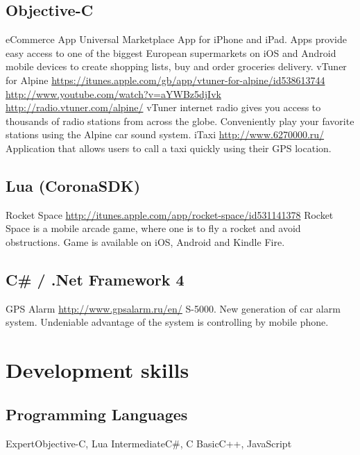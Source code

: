 \documentclass[11pt,a4paper]{moderncv}
\begin{document}
  \subsection{Objective-C}
  \cvitem
    {eCommerce App}
    {Universal Marketplace App for iPhone and iPad. Apps provide easy access to one of the biggest European supermarkets on iOS and Android mobile devices to create shopping lists, buy and order groceries delivery.}
  \cvitem
    {vTuner for Alpine}
    {\url{https://itunes.apple.com/gb/app/vtuner-for-alpine/id538613744}\newline{}
    \url{http://www.youtube.com/watch?v=aYWBz5djIvk}\newline
    \url{http://radio.vtuner.com/alpine/}\newline
    vTuner internet radio gives you access to thousands of radio stations from across the globe.
    \newline Conveniently play your favorite stations using the Alpine car sound system. }
  \cvitem
    {iTaxi}
    {\url{http://www.6270000.ru/}\newline{}
    Application that allows users to call a taxi quickly using their GPS location.}
    
  \subsection{Lua (CoronaSDK)}
  \cvitem
    {Rocket Space}
    {\url{http://itunes.apple.com/app/rocket-space/id531141378}\newline{}
    Rocket Space is a mobile arcade game, where one is to fly a rocket and avoid obstructions.\newline
    Game is available on iOS, Android and Kindle Fire.}
    
  \subsection{C\# / .Net Framework 4}
  \cvitem
    {GPS Alarm}
    {\url{http://www.gpsalarm.ru/en/}\newline{}
    S-5000. New generation of car alarm system.\newline
    Undeniable advantage of the system is controlling by mobile phone.}

\section{Development skills}
\subsection{Programming Languages}
\cvitem
  {Expert}{Objective-C, Lua}
\cvitem
  {Intermediate}{C\#, C}
\cvitem
  {Basic}{C++, JavaScript}
\end{document}
